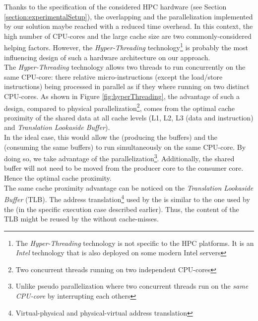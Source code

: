 		Thanks to the specification of the considered HPC hardware (see Section \ref{section:experimentalSetup}), the overlapping and the parallelization implemented by our solution maybe reached with a reduced time overhead.   In this context, the high number of CPU-cores and the large cache size are two commonly-considered helping factors.   However, the \emph{Hyper-Threading} technology\cite{magro2002hyper}\footnote{The \emph{Hyper-Threading} technology is not specific to the HPC platforms.   It is an \emph{Intel} technology that is also deployed on some modern Intel servers} is probably the most influencing design of such a hardware architecture on our approach.\\
		The \emph{Hyper-Threading} technology allows two threads to run concurrently on the same CPU-core:   there relative micro-instructions (except the load/store instructions) being processed in parallel as if they where running on two distinct CPU-cores.   As shown in Figure \ref{fig:hyperThreading}, the advantage of such a design, compared to physical parallelization\footnote{Two concurrent threads running on two independent CPU-cores}, comes from the optimal cache proximity of the shared data at all cache levels (L1, L2, L3 (data and instruction) and \emph{Translation Lookaside Buffer}).\\
		In the ideal case, this would allow the \notationaioComputeThread\space (producing the buffers) and the \notationaioWriteThread\space (consuming the same buffers) to run simultaneously on the same CPU-core.   By doing so, we take advantage of the parallelization\footnote{Unlike pseudo parallelization where two concurrent threads run on the \emph{same CPU-core} by interrupting each others}.  Additionally, the shared buffer will not need to be moved from the producer core to the consumer core.   Hence the optimal cache proximity.\\
		The same cache proximity advantage can be noticed on the \emph{Translation Lookaside Buffer} (TLB).   The address translation\footnote{Virtual-physical and physical-virtual address translation} used by the \notationaioComputeThread\space is similar to the one used by the \notationaioWriteThread\space (in the specific execution case described earlier).   Thus, the content of the TLB might be reused by the \notationaioWriteThread\space without cache-misses.\\

